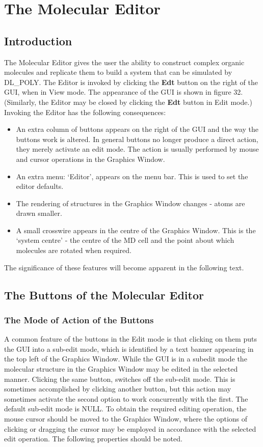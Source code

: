 \section{The Molecular Editor}

\subsection{Introduction}

The Molecular Editor gives the user the ability to construct complex organic
molecules and replicate them to build a system that can be simulated by
DL\_POLY.  The Editor is invoked by clicking the {\bf Edt} button on the right
of the GUI, when in View mode. The appearance of the GUI is shown in figure
32.  (Similarly, the Editor may be closed by clicking the {\bf Edt} button in
Edit mode.)  Invoking the Editor has the following consequences:

\begin{itemize}
\item An extra column of buttons appears on the right of the GUI and the way
  the buttons work is altered. In general buttons no longer produce a direct
  action, they merely activate an edit mode. The action is usually performed
  by mouse and cursor operations in the Graphics Window.
\item An extra menu: `Editor', appears on the menu bar. This is used to set
  the editor defaults.  
\item The rendering of structures in the Graphics Window changes - atoms are
  drawn smaller.
\item A small crosswire appears in the centre of the Graphics Window. This is
  the `system centre' - the centre of the MD cell and the point about which
  molecules are rotated when required.
\end{itemize}
The significance of these features will become apparent in the following text.

\subsection{The Buttons of the Molecular Editor}

\subsubsection{The Mode of Action of the Buttons}

A common feature of the buttons in the Edit mode is that clicking on them puts
the GUI into a sub-edit mode, which is identified by a text banner appearing
in the top left of the Graphics Window. While the GUI is in a subedit mode the
molecular structure in the Graphics Window may be edited in the selected
manner. Clicking the same button, switches off the sub-edit mode. This is
sometimes accomplished by clicking another button, but this action may
sometimes activate the second option to work concurrently with the first. The
default sub-edit mode is NULL. To obtain the required editing operation, the
mouse cursor should be moved to the Graphics Window, where the options of
clicking or dragging the cursor may be employed in accordance with the
selected edit operation. The following properties should be noted.

